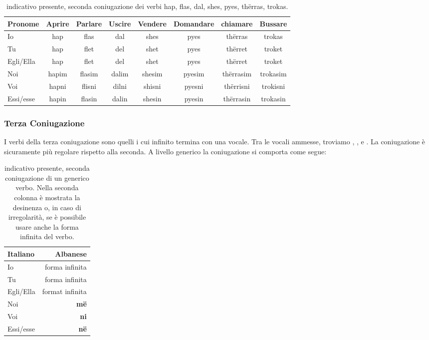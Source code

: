 \begin{table}[H]
    \centering
    \begin{tabular}{lccccccc}
        \toprule
        Pronome     &   Aprire  & Parlare   & Uscire    & Vendere   & Domandare & chiamare & Bussare \\
        \midrule
        Io          &   hap     & flas      & dal       & shes      & pyes  & thërras   & trokas\\
        Tu          &   hap     & flet      & del       & shet      & pyes  & thërret   & troket\\
        Egli/Ella   &   hap     & flet      & del       & shet      & pyes &    thërret & troket\\
        Noi         &   hapim   & flasim    & dalim     & shesim    & pyesim    & thërrasim & trokasim\\
        Voi         &   hapni   & flisni    & dilni     & shisni    &pyesni     & thërrisni & trokisni\\
        Essi/esse   &   hapin   & flasin    & dalin     & shesin    & pyesin    & thërrasin & trokasin\\
        \bottomrule
    \end{tabular}
    \caption{indicativo presente, seconda coniugazione dei verbi hap, flas, dal, shes, pyes, thërras, trokas.}
    \label{tbl:verb:secondaconiugazione:indicativo:presente}
\end{table}

\subsubsection{Terza Coniugazione}

I verbi della terza coniugazione sono quelli i cui infinito termina con una vocale. Tra le vocali ammesse, troviamo , , e . La coniugazione è sicuramente più regolare rispetto alla seconda. A livello generico la coniugazione si comporta come segue:

\begin{table}[H]
    \centering
    \begin{tabular}{lr}
        \toprule
        Italiano    &   Albanese\\
        \midrule
        Io          &   forma infinita \\
        Tu          &   forma infinita\\
        Egli/Ella   &   format infinita\\
        Noi         &   \textbf{më} \\
        Voi         &   \textbf{ni} \\
        Essi/esse   &   \textbf{në} \\
        \bottomrule
    \end{tabular}
    \caption{indicativo presente, seconda coniugazione di un generico verbo. Nella seconda colonna è mostrata la desinenza o, in caso di irregolarità, se è possibile usare anche la forma infinita del verbo.}
    \label{tbl:verb:secondaconiugazione:indicativo:presente}
\end{table}

